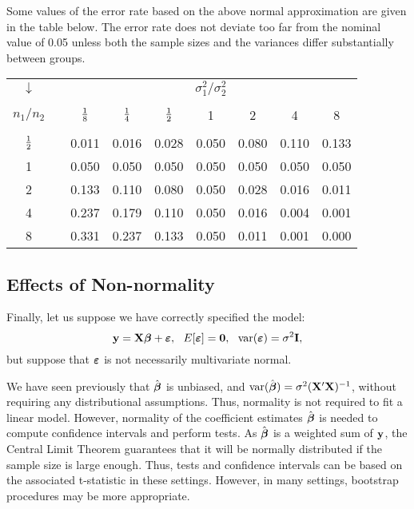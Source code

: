 Some values of the error rate based on the above normal approximation
are given in the table below.  The error rate does not deviate too far
from the nominal value of 0.05 unless both the sample sizes and the
variances differ substantially between groups.
\begin{center}
\begin{tabular}{crlllllll}
$\downarrow$&&\multicolumn{7}{c}{$\sigma_1^2/\sigma_2^2$}\\[1ex]
\cline{3-9}
\\
$n_1/n_2$&
&\multicolumn{1}{c}{${1\over 8}$}
&\multicolumn{1}{c}{${1\over 4}$}
&\multicolumn{1}{c}{${1\over 2}$}
&\multicolumn{1}{c}{1}
&\multicolumn{1}{c}{2}
&\multicolumn{1}{c}{4}
&\multicolumn{1}{c}{8}\\[2ex]
\cline{3-9}
\\
${1\over 2}$ && 0.011 & 0.016 & 0.028 & 0.050 & 0.080 & 0.110 & 0.133\\
1 && 0.050 & 0.050 & 0.050 & 0.050 & 0.050 & 0.050 & 0.050\\
2 && 0.133 & 0.110 & 0.080 & 0.050 & 0.028 & 0.016 & 0.011\\
4 && 0.237 & 0.179 & 0.110 & 0.050 & 0.016 & 0.004 & 0.001\\
8 && 0.331 & 0.237 & 0.133 & 0.050 & 0.011 & 0.001 & 0.000\\[1ex]
\hline
\end{tabular}
\end{center}

\eexa


\subsection{Effects of Non-normality}

Finally, let us suppose we have correctly specified the model: 
$$\ \
\mathbf{y}=\mathbf{X}\mbox{\boldmath $\beta$}+\mbox{\boldmath $\varepsilon$},\ \ E[\mbox{\boldmath $\varepsilon$}]=\mathbf{0},\ \
\mathrm{var}(\mbox{\boldmath $\varepsilon$})=\sigma^2\mathbf{I},\ \ $$ but suppose that $\mbox{\boldmath $\varepsilon$}$ is not
necessarily multivariate normal.

We have seen previously that $\hat{\mbox{\boldmath $\beta$}}$ is unbiased, and
$\mathrm{var}(\hat{\mbox{\boldmath $\beta$}})=\sigma^2(\mathbf{X}'\mathbf{X})^{-1}$, without requiring any
distributional assumptions.  
Thus, normality is not required to fit a linear model.
However, normality of the coefficient estimates $\hat {\mbox{\boldmath $\beta$}}$ is needed to compute confidence intervals and perform tests. 
As $\hat {\mbox{\boldmath $\beta$}}$ is a weighted sum of $\mathbf{y}$, the Central Limit Theorem guarantees that it will be normally distributed if the sample size is large enough.
Thus, tests and confidence intervals can be based on the associated t-statistic in these settings.
However, in many settings, bootstrap procedures may be more appropriate.




